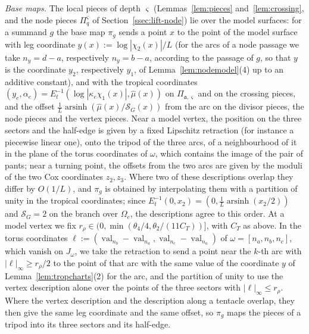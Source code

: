\emph{Base maps.} The local pieces of depth $\varsigma$ (Lemmas~\ref{lem:pieces} and~\ref{lem:crossing}, and the node
pieces $\Pi^\varsigma_q$ of Section~\ref{ssec:lift-node}) lie over the model surfaces: for a summand $g$ the base map $\pi_g$ sends a point $x$
to the point of the model surface with leg coordinate $y(x):=\log|\chi_2(x)|/L$ (for the arcs of a node passage we take
$n_y=d-a$, respectively $n_y=b-a$, according to the passage of $g$, so that $y$ is the coordinate $y_2$, respectively $y_1$, of
Lemma~\ref{lem:nodemodel}(4) up to an additive constant), and with the tropical coordinates
$(y_e,\alpha_e)=E_t^{-1}(\log|\kappa_e\chi_1(x)|,\hat\mu(x))$ on $\Pi_{\mathfrak a,\varsigma}$ and on the crossing
pieces, and the offset $\frac1L\operatorname{arsinh}(\hat\mu(x)/\mathcal S_G(x))$ from the arc on the divisor pieces, the
node pieces and the vertex pieces. Near a model vertex, the position on the three sectors and the half-edge is given by a
fixed Lipschitz retraction (for instance a piecewise linear one), onto the tripod of the three arcs, of a neighbourhood of it in the plane of the torus coordinates of
$\omega$, which contains the image of the pair of pants; near a turning point, the offsets from the two arcs are given by
the moduli of the two Cox coordinates $z_2,z_3$. Where two of these descriptions overlap they differ by $O(1/L)$, and
$\pi_g$ is obtained by interpolating them with a partition of unity in the tropical coordinates; since
$E_t^{-1}(0,x_2)=(0,\frac1L\operatorname{arsinh}(x_2/2))$ and $\mathcal S_G=2$ on the branch over $\Omega_e$, the
descriptions agree to this order. At a model vertex we fix $r_\rho\in(0,\min(\theta_4/4,\theta_2/(11C_T))]$, with $C_T$
as above. In the torus coordinates $\ell:=(\operatorname{val}_{n_b}-\operatorname{val}_{n_a},\operatorname{val}_{n_c}-\operatorname{val}_{n_a})$
of $\omega=[n_a,n_b,n_c]$, which vanish on $J_\omega$, we take the retraction to send a point near the $k$-th arc with
$|\ell|_\infty\ge r_\rho/2$ to the point of that arc with the same value of the coordinate $y$ of
Lemma~\ref{lem:tropcharts}(2) for the arc, and the partition of unity to use the vertex description alone over the points
of the three sectors with $|\ell|_\infty\le r_\rho$. Where the vertex
description and the description along a tentacle overlap, they then give the
same leg coordinate and the same offset, so $\pi_g$ maps the pieces of a tripod into its three sectors and its half-edge.

